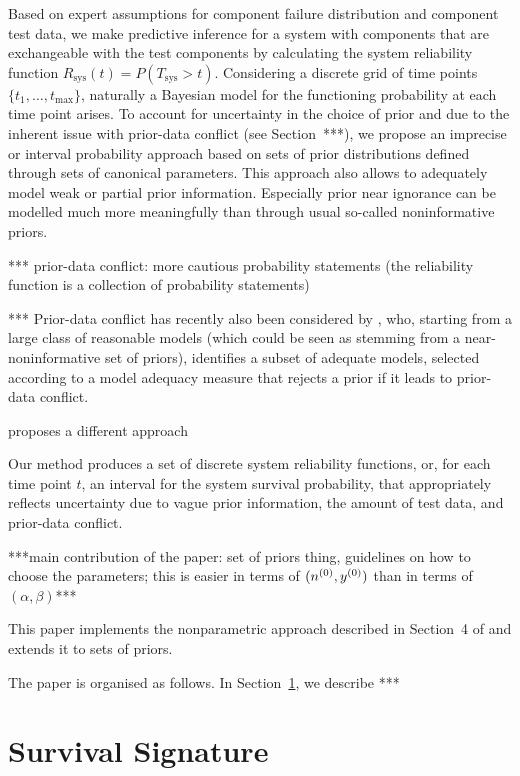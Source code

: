\documentclass[12pt, a4paper]{elsarticle}
\newcommand{\Rsys}{R_\text{sys}}
\def\Tsys{T_\text{sys}}
\def\tmax{t_\text{max}}
\begin{document}
Based on expert assumptions for component failure distribution and component test data,
we make predictive inference for a system with components that are exchangeable
with the test components by calculating the system reliability function $\Rsys(t) = P(\Tsys > t)$.
Considering a discrete grid of time points $\{t_1, \ldots, \tmax\}$,
naturally a Bayesian model for the functioning probability at each time point arises.
To account for uncertainty in the choice of prior and due to the inherent issue with prior-data conflict (see Section~***),
we propose an imprecise or interval probability approach
based on sets of prior distributions defined through sets of canonical parameters.
This approach also allows to adequately model weak or partial prior information.
Especially prior near ignorance can be modelled much more meaningfully than through usual so-called noninformative priors. 

*** prior-data conflict: more cautious probability statements
(the reliability function is a collection of probability statements)

*** Prior-data conflict has recently also been considered by \citet{2015:bickel},
who, starting from a large class of reasonable models
(which could be seen as stemming from a near-noninformative set of priors),
identifies a subset of adequate models,
selected according to a model adequacy measure that rejects a prior if it leads to prior-data conflict.

 proposes a different approach

Our method produces a set of discrete system reliability functions,
or, for each time point $t$, an interval for the system survival probability,
that appropriately reflects uncertainty due to vague prior information, the amount of test data, and prior-data conflict.

***main contribution of the paper:
set of priors thing,
guidelines on how to choose the parameters;
this is easier in terms of $(n^{(0)}, y^{(0)})$ than in terms of $(\alpha, \beta)$***

This paper implements the nonparametric approach described in Section~4 of \citet{2015:bayessurvsign}
and extends it to sets of priors.

The paper is organised as follows.
In Section~\ref{sec:survsign}, we describe ***


\section{Survival Signature}
\label{sec:survsign}
\end{document}
